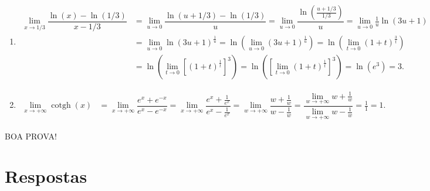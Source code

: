 \documentclass[12pt,a4paper]{article}
\newcommand*\cotgh{\operatorname{cotgh}}
\begin{document}
\begin{ExerciseList}
\begin{enumerate}
\item
\begin{align*}
  \lim\limits_{x\to 1/3} \dfrac{\ln(x) - \ln(1/3)}{x-1/3}
& = \lim\limits_{u\to 0} \dfrac{ \ln( u + 1/3 ) - \ln(1/3) }{u}
= \lim\limits_{u\to 0} \dfrac{ \ln\left( \frac{ u + 1/3 }{ 1/3 } \right)}{u}
= \lim\limits_{u\to 0} \frac{1}{u} \ln\left( 3u + 1 \right) \\
& = \lim\limits_{u\to 0}  \ln\left( 3u + 1 \right)^{\frac{1}{u}}
 = \ln\left( \lim\limits_{u\to 0} \left( 3u + 1 \right)^{\frac{1}{u}} \right)
 = \ln\left( \lim\limits_{t\to 0} \left( 1 + t \right)^{\frac{3}{t}} \right)\\
& = \ln\left( \lim\limits_{t\to 0} \left[ \left( 1 + t \right)^{\frac{1}{t}} \right]^3 \right)
  = \ln\left( \left[ \lim\limits_{t\to 0} \left( 1 + t \right)^{\frac{1}{t}} \right]^3 \right)
  = \ln(e^3)
  = 3.
\end{align*}

\item
\begin{align*}
\lim\limits_{x\to +\infty} \cotgh(x)
& = \lim\limits_{x\to +\infty} \dfrac{e^x+e^{-x}}{e^x-e^{-x}}
= \lim\limits_{x\to +\infty} \dfrac{e^x+\frac{1}{e^x}}{e^x-\frac{1}{e^x}}
= \lim\limits_{w\to +\infty} \dfrac{w+\frac{1}{w}}{w-\frac{1}{w}}
= \dfrac{\lim\limits_{w\to +\infty}  w+\frac{1}{w}}{\lim\limits_{w\to +\infty}  w-\frac{1}{w}}
= \frac{1}{1}
= 1.
\end{align*}

\end{enumerate}
\end{ExerciseList}

\begin{center}
BOA PROVA!
\end{center}

\newpage
\restoregeometry
\section*{Respostas}
\shipoutAnswer
\end{document}

